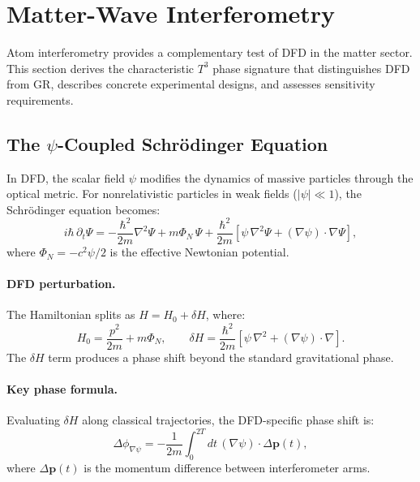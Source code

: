 
\section{Matter-Wave Interferometry}\label{sec:matter_wave}

Atom interferometry provides a complementary test of DFD in the matter sector. This section derives the characteristic $T^3$ phase signature that distinguishes DFD from GR, describes concrete experimental designs, and assesses sensitivity requirements.

\subsection{The $\psi$-Coupled Schr\"odinger Equation}\label{sec:mw-schrodinger}

In DFD, the scalar field $\psi$ modifies the dynamics of massive particles through the optical metric. For nonrelativistic particles in weak fields ($|\psi| \ll 1$), the Schr\"odinger equation becomes:
\begin{equation}\label{eq:schro-dfd}
i\hbar\,\partial_t\Psi = -\frac{\hbar^2}{2m}\nabla^2\Psi + m\Phi_N\,\Psi + \frac{\hbar^2}{2m}\left[\psi\,\nabla^2\Psi + (\nabla\psi)\cdot\nabla\Psi\right],
\end{equation}
where $\Phi_N = -c^2\psi/2$ is the effective Newtonian potential.

\paragraph{DFD perturbation.}
The Hamiltonian splits as $H = H_0 + \delta H$, where:
\begin{equation}
H_0 = \frac{p^2}{2m} + m\Phi_N, \qquad \delta H = \frac{\hbar^2}{2m}\left[\psi\,\nabla^2 + (\nabla\psi)\cdot\nabla\right].
\end{equation}
The $\delta H$ term produces a phase shift beyond the standard gravitational phase.

\paragraph{Key phase formula.}
Evaluating $\delta H$ along classical trajectories, the DFD-specific phase shift is:
\begin{equation}\label{eq:dfd-phase-key}
\boxed{\Delta\phi_{\nabla\psi} = -\frac{1}{2m}\int_0^{2T} dt\, (\nabla\psi)\cdot\Delta\mathbf{p}(t)},
\end{equation}
where $\Delta\mathbf{p}(t)$ is the momentum difference between interferometer arms.

